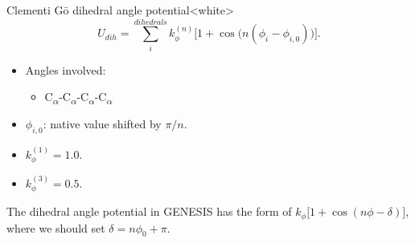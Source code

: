 \begin{smallpage}{Clementi G\={o} dihedral angle potential}<white>
  \begin{equation}
    \label{eq:protein_cc_go_local_dihedral_angle}
    U_{dih} = \sum_{i}^{dihedrals} k_{\phi}^{(n)} \big[ 1+\cos\big(n( \phi_i - \phi_{ i,0 } )\big) \big].
  \end{equation}
  \tcblower
  \begin{itemize}
  \item Angles involved:
    \begin{itemize}
    \item C\textsubscript{$\alpha$}-C\textsubscript{$\alpha$}-C\textsubscript{$\alpha$}-C\textsubscript{$\alpha$}
    \end{itemize}
  \item $\phi_{i, 0}$: native value shifted by $\pi/n$.
  \item $k_\phi^{(1)} = 1.0$.
  \item $k_\phi^{(3)} = 0.5$.
  \end{itemize}
\end{smallpage}

\note{} The dihedral angle potential in GENESIS has the form of $k_{\phi} \big[
1+\cos(n\phi - \delta)\big]$, where we should set $\delta = n\phi_0 + \pi$.

